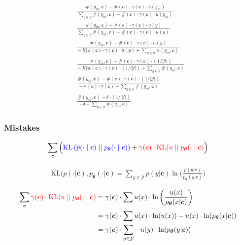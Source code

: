\documentclass{article}
\newcommand{\KL}{\mathrm{KL}}
\newcommand{\uniform}{u}
\newcommand{\vtheta}{\boldsymbol{\theta}}
\newcommand{\model}{p_{\vtheta}}
\newcommand{\context}{\boldsymbol{c}}
\begin{document}
		\begin{align}
			&\frac{\#(y_m, \context) - \#(\context)\cdot \gamma(\context)\cdot u(y_m)}{\sum_{y\in\mathcal{Y}} \#(y_m, \context) - \#(\context)\cdot \gamma(\context)\cdot u(y_m)}  \\
			&\frac{\#(y_m, \context) - \#(\context)\cdot \gamma(\context)\cdot u(y)}{\sum_{y\in\mathcal{Y}} \#(y_m, \context) - \#(\context)\cdot \gamma(\context)\cdot u(y)}  \\
			&\frac{\#(y_m, \context) - \#(\context)\cdot \gamma(\context)\cdot u(y)}{ - |\mathcal{Y}| \#(\context)\cdot \gamma(\context)\cdot u(y) + \sum_{y\in\mathcal{Y}} \#(y_m, \context)} \\
			&\frac{\#(y_m, \context) - \#(\context)\cdot \gamma(\context)\cdot (1/|\mathcal{Y}|)}{ - |\mathcal{Y}| \#(\context)\cdot \gamma(\context)\cdot (1/|\mathcal{Y}|) + \sum_{y\in\mathcal{Y}} \#(y_m, \context)} \\
			&\frac{\#(y_m, \context) - \#(\context)\cdot \gamma(\context)\cdot (1/|\mathcal{Y}|)}{ -  \#(\context)\cdot \gamma(\context) + \sum_{y\in\mathcal{Y}} \#(y_m, \context)} \\
			&\frac{\#(y_m, \context) - \delta\cdot (1/|\mathcal{Y}|)}{ -  \delta + \sum_{y\in\mathcal{Y}} \#(y_m, \context)}
		\end{align}
		
		\subsubsection{Mistakes}
		
			\begin{align}
		  		\sum_{\context} \Big( {\color{blue} \KL\left(\tilde{p}(\cdot 			\mid \context) \mid\mid \model(\cdot \mid \context)					\right)} + {\color{red}\gamma(\context) \cdot 						\KL(\uniform \mid\mid \model(\cdot \mid \context)}\Big)
			\end{align}
			
			\begin{align}
				\KL(p(\cdot|\context), \model(\cdot|\context) = \sum_{y\in\mathcal{Y}} p(y|\context)\ln\bigg(\frac{p(y|\context)}{\model(y|\context)} \bigg)
			\end{align}
			
			\begin{align}
				\sum_{\context} {\color{red}\gamma(\context) \cdot 						\KL(\uniform \mid\mid \model(\cdot \mid \context)} &= \gamma(\context)\cdot\sum u(x)\cdot \ln\bigg(\frac{u(x)}{\model(x|\context)}\bigg)\\
			&= \gamma(\context)\cdot\sum u(x)\cdot\ln(u(x)) - u(x)\cdot\ln(\model(x|\context))\\
			&= \gamma(\context)\cdot\sum_{y\in\mathcal{Y}} - u(y)\cdot\ln(\model(y|\context))
			\end{align}
			
\end{document}

